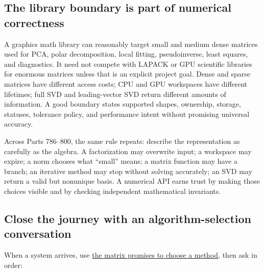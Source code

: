 \subsection{The library boundary is part of numerical correctness}\label{the-library-boundary-is-part-of-numerical-correctness}

A graphics math library can reasonably target small and medium dense matrices used for PCA, polar decomposition, local fitting, pseudoinverse, least squares, and diagnostics. It need not compete with LAPACK or GPU scientific libraries for enormous matrices unless that is an explicit project goal. Dense and sparse matrices have different access costs; CPU and GPU workspaces have different lifetimes; full SVD and leading-vector SVD return different amounts of information. A good boundary states supported shapes, ownership, storage, statuses, tolerance policy, and performance intent without promising universal accuracy.

Across Parts 786--800, the same rule repeats: describe the representation as carefully as the algebra. A factorization may overwrite input; a workspace may expire; a norm chooses what ``small'' means; a matrix function may have a branch; an iterative method may stop without solving accurately; an SVD may return a valid but nonunique basis. A numerical API earns trust by making those choices visible and by checking independent mathematical invariants.

\subsection{Close the journey with an algorithm-selection conversation}\label{close-the-journey-with-an-algorithm-selection-conversation}

When a system arrives, use \hyperref[02-foundations-ii-ch038]{the matrix promises to choose a method}, then ask in order:

